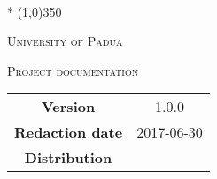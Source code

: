 \documentclass[a4paper,12pt]{article}
\date{2017-05-10}
\begin{document}
	\begin{titlepage}
		\centering
		{\huge\bfseries \nomeprogetto\par}
		\sottotitolo \\*
		\line(1,0){350} \\
		{\scshape\LARGE University of Padua \par}
		\vspace{1cm}
		{\scshape\Large Project documentation \par}
		\logo
		\newpage
		\begin{tabular}{c|c}
			{\hfill\textbf{Version}} 			& 1.0.0 \\ 
			{\hfill\textbf{Redaction date}} 	& 2017-06-30 \\ 
			{\hfill\textbf{Distribution}} 		& \abujari \\
		\end{tabular}
	\end{titlepage}
	
	\pagestyle{myfront}
	\newpage
	\tableofcontents
	\newpage
	\listoftables
	\newpage
	\listoffigures
	
	\label{LastFrontPage}	
	\newpage	
	\pagestyle{mymain}
				
	\newpage	
		
	\newpage	
			
%		
		
	\label{LastPage}
\end{document}
